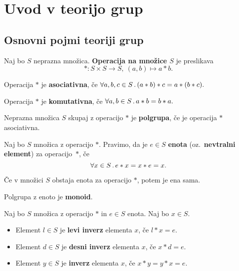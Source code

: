 \section{Uvod v teorijo grup}
\subsection{Osnovni pojmi teoriji grup}
\begin{definicija}
    Naj bo $S$ neprazna množica. \textbf{Operacija na množice $S$} je preslikava $$*: S \times S \to S, \ (a,b) \mapsto a * b.$$

    Operacija $*$ je \textbf{asociativna}, če $\forall a, b, c \in S \,.\, (a*b)*c = a*(b*c).$

    Operacija $*$ je \textbf{komutativna}, če $\forall a, b \in S \,.\, a* b = b* a.$
\end{definicija}

\begin{definicija}
    Neprazna množica $S$ skupaj z operacijo $*$ je \textbf{polgrupa}, če je operacija $*$ asociativna.
\end{definicija}

\begin{definicija}
    Naj bo $S$ množica z operacijo $*$. Pravimo, da je $e \in S$ \textbf{enota} (oz.\ \textbf{nevtralni element}) za operacijo~$*$, če$$\forall x \in S \,.\, e * x = x * e = x.$$
\end{definicija}

\begin{trditev}
    Če v množici $S$ obstaja enota za operacijo $*$, potem je ena sama.
\end{trditev}

\begin{definicija}
    Polgrupa z enoto je \textbf{monoid}.
\end{definicija}

\begin{definicija}
    Naj bo $S$ množica z operacijo $*$ in $e \in S$ enota. Naj bo $x \in S$.
    \begin{itemize}
        \item Element $l \in S$ je \textbf{levi inverz} elementa $x$, če $l * x = e$.
        \item Element $d \in S$ je \textbf{desni inverz} elementa $x$, če $x * d = e$.
        \item Element $y \in S$ je \textbf{inverz} elementa $x$, če $x *y = y* x = e$.
    \end{itemize}
\end{definicija}

